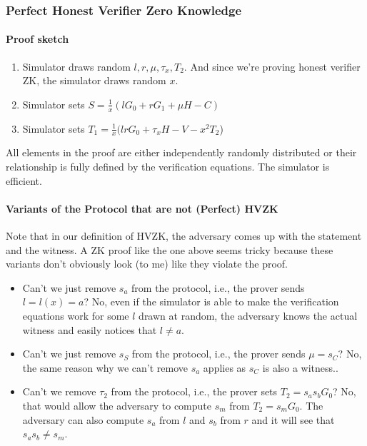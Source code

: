 \subsubsection{Perfect Honest Verifier Zero Knowledge}

\paragraph{Proof sketch}
\begin{enumerate}
  \item Simulator draws random $l, r, \mu, \tau_x, T_2$. And since we're proving honest verifier ZK, the simulator draws random $x$.
  \item Simulator sets $S = \frac{1}{x}(lG_0 + rG_1 + \mu H - C)$
  \item Simulator sets $T_1 = \frac{1}{x}(lrG_0 + \tau_xH - V - x^2T_2$)
\end{enumerate}
All elements in the proof are either independently randomly distributed or their relationship is fully defined by the verification equations.
The simulator is efficient.

\paragraph{Variants of the Protocol that are not (Perfect) HVZK}
Note that in our definition of HVZK, the adversary comes up with the statement and the witness.
A ZK proof like the one above seems tricky because these variants don't obviously look (to me) like they violate the proof.

\begin{itemize}
  \item Can't we just remove $s_a$ from the protocol, i.e., the prover sends $l = l(x) = a$? No, even if the simulator is able to make the verification equations work for some $l$ drawn at random, the adversary knows the actual witness and easily notices that $l \ne a$.
  \item Can't we just remove $s_S$ from the protocol, i.e., the prover sends $\mu = s_C$? No, the same reason why we can't remove $s_a$ applies as $s_C$ is also a witness..
  \item Can't we remove $\tau_2$ from the protocol, i.e., the prover sets $T_2 = s_as_bG_0$? No, that would allow the adversary to compute $s_m$ from $T_2 = s_mG_0$. The adversary can also compute $s_a$ from $l$ and $s_b$ from $r$ and it will see that $s_as_b \ne s_m$.
\end{itemize}

